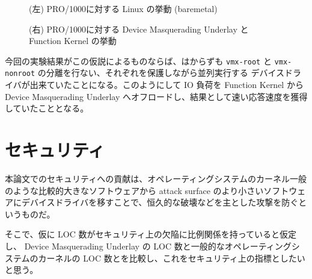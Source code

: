 \documentclass[a4paper,11pt,report]{ltjsbook}
\begin{document}
\begin{landscape}
\begin{figure}[htbp]
\begin{minipage}{\hsize}
\begin{center}
\caption{(左) PRO/1000に対する Linux の挙動 (baremetal)}
\caption{(右) PRO/1000に対する Device Masquerading Underlay と Function Kernel の挙動}
  \end{center}
\end{minipage}
\end{figure}
\newpage
\end{landscape}

今回の実験結果がこの仮説によるものならば、はからずも \texttt{vmx-root} と \texttt{vmx-nonroot} の分離を行ない、それぞれを保護しながら並列実行する デバイスドライバが出来ていたことになる。このようにして IO 負荷を Function Kernel から Device Masquerading Underlay へオフロードし、結果として速い応答速度を獲得していたこととなる。


\section{セキュリティ}

本論文でのセキュリティへの貢献は、オペレーティングシステムのカーネル一般のような比較的大きなソフトウェアから attack surface のより小さいソフトウェアにデバイスドライバを移すことで、恒久的な破壊などを主とした攻撃を防ぐというものだ。

そこで、仮に LOC 数がセキュリティ上の欠陥に比例関係を持っていると仮定し、 Device Masquerading Underlay の LOC 数と一般的なオペレーティングシステムのカーネルの LOC 数とを比較し、これをセキュリティ上の指標としたいと思う。
\end{document}

